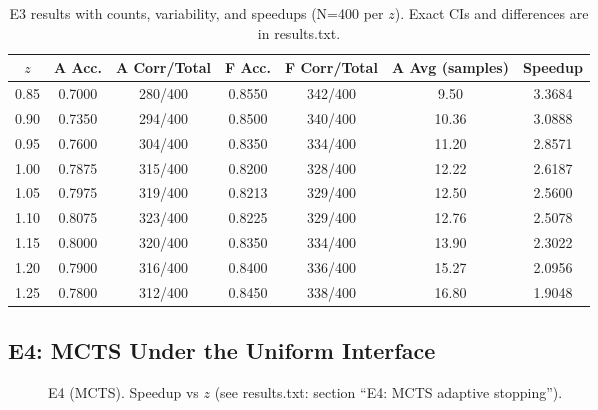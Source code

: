\begin{table}[H]
  \centering
  \caption{E3 results with counts, variability, and speedups (N=400 per $z$). Exact CIs and differences are in results.txt.}
  \vspace{0.25em}
  \begin{adjustbox}{width=\linewidth}
  \begin{tabular}{c c c c c c c}
    \toprule
    $z$ & A Acc. & A Corr/Total & F Acc. & F Corr/Total & A Avg (samples) & Speedup \\
    \midrule
    0.85 & 0.7000 & 280/400 & 0.8550 & 342/400 & 9.50 & 3.3684 \\
    0.90 & 0.7350 & 294/400 & 0.8500 & 340/400 & 10.36 & 3.0888 \\
    0.95 & 0.7600 & 304/400 & 0.8350 & 334/400 & 11.20 & 2.8571 \\
    1.00 & 0.7875 & 315/400 & 0.8200 & 328/400 & 12.22 & 2.6187 \\
    1.05 & 0.7975 & 319/400 & 0.8213 & 329/400 & 12.50 & 2.5600 \\
    1.10 & 0.8075 & 323/400 & 0.8225 & 329/400 & 12.76 & 2.5078 \\
    1.15 & 0.8000 & 320/400 & 0.8350 & 334/400 & 13.90 & 2.3022 \\
    1.20 & 0.7900 & 316/400 & 0.8400 & 336/400 & 15.27 & 2.0956 \\
    1.25 & 0.7800 & 312/400 & 0.8450 & 338/400 & 16.80 & 1.9048 \\
    \bottomrule
  \end{tabular}
  \end{adjustbox}
\end{table}

\subsection{E4: MCTS Under the Uniform Interface}
\begin{figure}[H]
  \centering
  \begin{adjustbox}{width=\linewidth}
  \end{adjustbox}
  \caption{E4 (MCTS). Speedup vs $z$ (see results.txt: section ``E4: MCTS adaptive stopping'').}
  \label{fig:e4a}
\end{figure}

